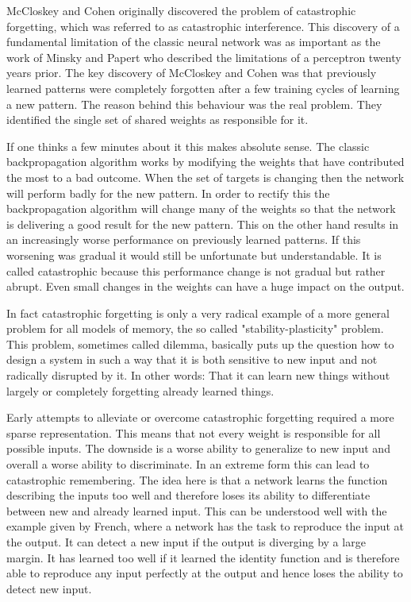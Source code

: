 \documentclass[12pt,twoside]{scrartcl}
\theoremstyle{plain}
\theoremstyle{definition}
\theoremstyle{remark}
\begin{document}
McCloskey and Cohen\cite{McCloskey1989} originally discovered the problem of
catastrophic forgetting, which was referred to as catastrophic interference. This
discovery of a fundamental limitation of the classic neural network was as
important as the work of Minsky and Papert\cite{Minsky1969} who described the
limitations of a perceptron twenty years prior. The key discovery of McCloskey
and Cohen was that previously learned patterns were completely forgotten after
a few training cycles of learning a new pattern. The reason behind this
behaviour was the real problem. They identified the single set of shared
weights as responsible for it.

If one thinks a few minutes about it this makes absolute sense. The classic
backpropagation algorithm works by modifying the weights that have contributed
the most to a bad outcome. When the set of targets is changing then the network
will perform badly for the new pattern. In order to rectify this the backpropagation
algorithm will change many of the weights so that the network is delivering a
good result for the new pattern. This on the other hand results in an increasingly
worse performance on previously learned patterns. If this worsening was gradual
it would still be unfortunate but understandable. It is called catastrophic
because this performance change is not gradual but rather abrupt. Even small
changes in the weights can have a huge impact on the output.

In fact catastrophic forgetting is only a very radical example of a more general
problem for all models of memory, the so called "stability-plasticity" problem\cite{Grossberg1982}.
This problem, sometimes called dilemma, basically puts up the question how to
design a system in such a way that it is both sensitive to new input and not
radically disrupted by it. In other words: That it can learn new things
without largely or completely forgetting already learned things.

Early attempts to alleviate or overcome catastrophic forgetting required a more
sparse representation. This means that not every weight is responsible for all
possible inputs. The downside is a worse ability to generalize to new input
and overall a worse ability to discriminate. In an extreme form this can
lead to catastrophic remembering\cite{Sharkey1995}.
The idea here is that a
network learns the function describing the inputs too well and therefore
loses its ability to differentiate between new and already learned input.
This can be understood well with the example given by French\cite{French1999},
where a network has the task to reproduce the input at the output. It can detect
a new input if the output is diverging by a large margin. It has learned too well
if it learned the identity function and is therefore able to reproduce any
input perfectly at the output and hence loses the ability to detect new input.
\end{document}

